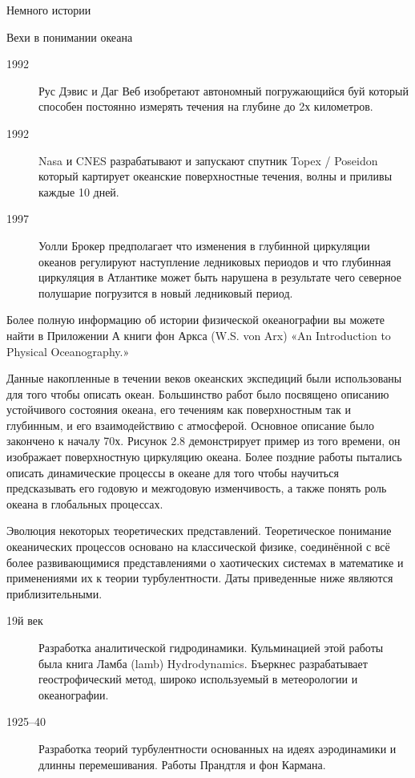 \begin{chapter}{Немного истории}
\begin{section}{Вехи в понимании океана}
\begin{description}
\item[1992] Рус Дэвис и Даг Веб изобретают автономный погружающийся
буй который способен постоянно измерять течения на глубине до 2х
километров.

\item[1992] Nasa и CNES разрабатывают и запускают спутник Topex /
Poseidon который картирует океанские поверхностные течения, волны и
приливы каждые 10 дней.

\item[1997] Уолли Брокер предполагает что изменения в глубинной
циркуляции океанов регулируют наступление ледниковых периодов и что
глубинная циркуляция в Атлантике может быть нарушена в результате чего
северное полушарие погрузится в новый ледниковый период.
\end{description}

Более полную информацию об истории физической океанографии вы можете
найти в Приложении А книги фон Аркса (W.S. von Arx) «An Introduction
to Physical Oceanography.»

Данные накопленные в течении веков океанских экспедиций были
использованы для того чтобы описать океан. Большинство работ было
посвящено описанию устойчивого состояния океана, его течениям как
поверхностным так и глубинным, и его взаимодействию с
атмосферой. Основное описание было закончено к началу 70х. Рисунок 2.8
демонстрирует пример из того времени, он изображает поверхностную
циркуляцию океана. Более поздние работы пытались описать динамические
процессы в океане для того чтобы научиться предсказывать его годовую и
межгодовую изменчивость, а также понять роль океана в глобальных
процессах.
\end{section}

\begin{section}{Эволюция некоторых теоретических представлений.}
Теоретическое понимание океанических процессов основано на
классической физике, соединённой с всё более развивающимися
представлениями о хаотических системах в математике и применениями их
к теории турбулентности. Даты приведенные ниже являются
приблизительными.

\begin{description}
\item[19й век] Разработка аналитической гидродинамики. Кульминацией
этой работы была книга Ламба (lamb) Hydrodynamics. Бъеркнес
разрабатывает геострофический метод, широко используемый в
метеорологии и океанографии.

\item[1925--40] Разработка теорий турбулентности основанных на идеях
аэродинамики и длинны перемешивания. Работы Прандтля и фон Кармана.


\end{description}
\end{section}
\end{chapter}
